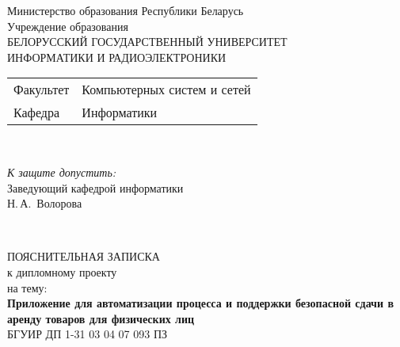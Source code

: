 

\begin{titlepage}
  \begin{center}
    Министерство образования Республики Беларусь\\[1em]
    Учреждение образования\\
    БЕЛОРУССКИЙ ГОСУДАРСТВЕННЫЙ УНИВЕРСИТЕТ \\
    ИНФОРМАТИКИ И РАДИОЭЛЕКТРОНИКИ\\[1em]

    \begin{minipage}{\textwidth}
      \begin{flushleft}
        \begin{tabular}{ l l }
          Факультет & Компьютерных систем и сетей\\
          Кафедра   & Информатики
        \end{tabular}
      \end{flushleft}
    \end{minipage}\\[1em]

    \begin{flushright}
      \begin{minipage}{0.4\textwidth}
        \textit{К защите допустить:}\\[0.8em]
        Заведующий кафедрой информатики\\[0.45em]
        \underline{\hspace*{2.8cm}} Н.\,А.~Волорова
      \end{minipage}\\[2.2em]
    \end{flushright}

    {ПОЯСНИТЕЛЬНАЯ ЗАПИСКА}\\
    {к дипломному проекту}\\
    {на тему:}\\[1em]
    \textbf{\large Приложение для автоматизации процесса и поддержки безопасной сдачи в аренду товаров для физических лиц}\\[1em]


    {БГУИР ДП 1-31 03 04 07 093 ПЗ}\\[2em]


\end{center}
\end{titlepage}
